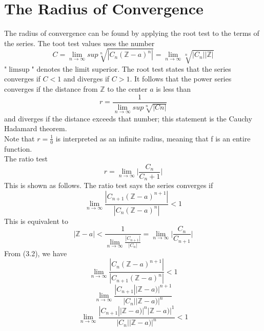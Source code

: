 \documentclass[a4paper, 12pt]{report}
\begin{document}
{\section{The Radius of Convergence}
The radius of convergence can be found by applying the root test to the terms of the series. The toot test values uses the number
\begin{equation*}
C = \lim_{n\rightarrow\infty}sup\sqrt[n]{|C_n(\mathbb{Z} - a)^n|} =  \lim_{n\rightarrow\infty}\sqrt[n]{|C_n||\mathbb{Z}|}
\end{equation*}
"$\limsup$" denotes the limit superior. The root test states that the series converges if $C < 1$ and diverges if $C > 1$.
It follows that the power series converges if the distance from $\mathbb{Z}$ to the center $a$ is less than
\begin{equation*}
r = \frac{1}{\lim_{n\rightarrow\infty} sup\sqrt[n]{|Cn|}} 
\end{equation*}
and diverges if the distance exceeds that  number; this statement is the Cauchy Hadamard theorem.\\
Note that $r = \frac{1}{0}$ is interpreted as an infinite radius, meaning that f is an entire function.\\
The ratio test
\begin{equation*}
r = \lim_{n\rightarrow\infty}\bigg|\frac{C_n}{C_n + 1}\bigg|
\end{equation*}
This is shown as follows. The ratio test says the series converges if 
\begin{equation}
\lim_{n\rightarrow\infty}\frac{|C_{n+1}(\mathbb{Z} - a)^{n+1}|}{|C_{n} (\mathbb{Z} - a)^{n}|} < 1
\end{equation}
This is equivalent to 
\begin{equation}
|\mathbb{Z} - a| < \frac{1}{\lim_{n\rightarrow\infty}\frac{|C_{n+1}|}{|C_n|}} = \lim_{n\rightarrow\infty}\bigg|\frac{C_n}{C_{n+1}}\bigg|
\end{equation}
From (3.2), we have 
\begin{equation*}
\lim_{n\rightarrow\infty}\frac{|C_{n}(\mathbb{Z} - a)^{n+1}|}{|C_{n+1} (\mathbb{Z} - a)^{n}|} < 1
\end{equation*}
\begin{equation*}
\lim_{n\rightarrow\infty}\frac{|C_{n+1}||\mathbb{Z} - a)|^{n+1}}{|C_{n}||\mathbb{Z} - a)|^{n}} 
\end{equation*}
\begin{equation*}
\lim_{n\rightarrow\infty}\frac{|C_{n+1}||\mathbb{Z} - a)|^{n}|\mathbb{Z} - a)|^{1}}{|C_{n}||\mathbb{Z} - a)|^{n}} < 1

\end{equation*}}
\end{document}
